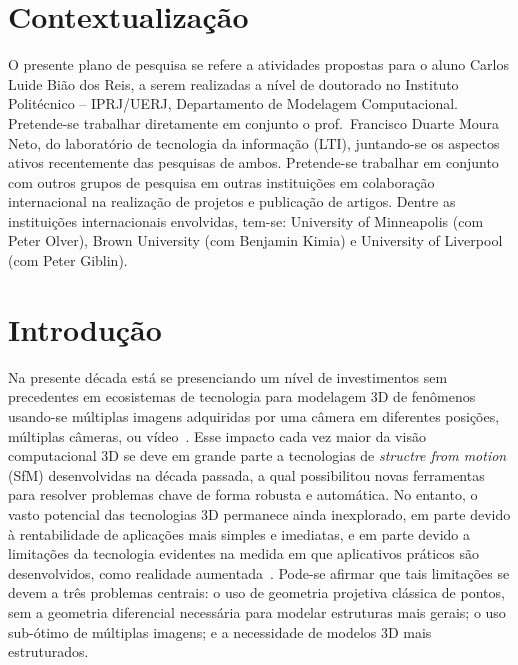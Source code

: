 \documentclass[a4paper,titlepage]{article}
\begin{document}


%


\section{Contextualização}

O presente plano de pesquisa se refere a atividades propostas para o aluno
Carlos Luide Bião dos Reis, a serem realizadas a nível de doutorado no Instituto
Politécnico -- IPRJ/UERJ, Departamento de Modelagem Computacional.
Pretende-se trabalhar diretamente em conjunto o prof.\ Francisco Duarte
Moura Neto, do laboratório de tecnologia da informação (LTI), juntando-se os
aspectos ativos recentemente das pesquisas de ambos. Pretende-se trabalhar em
conjunto com outros grupos de pesquisa em outras instituições em
colaboração internacional na realização de projetos e publicação de artigos.
Dentre as instituições internacionais envolvidas, tem-se: University of
Minneapolis (com Peter Olver), Brown University (com Benjamin Kimia) e
University of Liverpool (com Peter Giblin).

\section{Introdução}


Na presente década está se presenciando um nível de investimentos sem
precedentes em ecosistemas de tecnologia para modelagem 3D de fenômenos
usando-se múltiplas imagens adquiridas por uma câmera em diferentes posições,
múltiplas câmeras, ou vídeo~\cite{AppleKeynote:2018}. %
Esse impacto cada vez maior da visão computacional 3D se deve em grande parte a
tecnologias de \emph{structre from motion} (SfM) desenvolvidas na década
passada, a qual possibilitou novas ferramentas para resolver problemas chave de
forma robusta e automática. No entanto, o vasto potencial das tecnologias 3D
permanece ainda inexplorado, em parte devido à rentabilidade de aplicações mais
simples e imediatas, e em parte devido a limitações da tecnologia evidentes
na medida em que aplicativos práticos são desenvolvidos, como realidade
aumentada~\cite{AppleKeynote:2018}. Pode-se afirmar que tais limitações se devem
a três problemas centrais: o uso de geometria projetiva clássica de pontos, sem 
a geometria diferencial necessária para modelar estruturas mais gerais; o uso
sub-ótimo de múltiplas imagens; e a necessidade de modelos 3D mais
estruturados.
\end{document}
